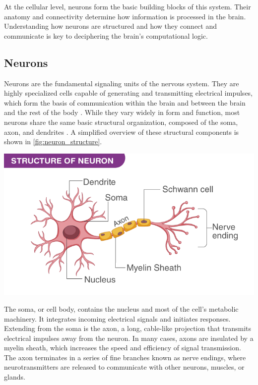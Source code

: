 At the cellular level, neurons form the basic building blocks of this system. Their anatomy and connectivity determine how information is processed in the brain. Understanding how neurons are structured and how they connect and communicate is key to deciphering the brain’s computational logic.

\subsection{Neurons}
Neurons are the fundamental signaling units of the nervous system. They are highly specialized cells capable of generating and transmitting electrical impulses, which form the basis of communication within the brain and between the brain and the rest of the body \cite{Kandel_2013, Purves_2001}. While they vary widely in form and function, most neurons share the same basic structural organization, composed of the soma, axon, and dendrites \cite{Purves_2001}. A simplified overview of these structural components is shown in \autoref{fig:neuron_structure}.

\begin{center}
    \includegraphics[width=.8\textwidth]{figures/01_neuron.png} 
    \label{fig:neuron_structure}
\end{center}

The soma, or cell body, contains the nucleus and most of the cell’s metabolic machinery. It integrates incoming electrical signals and initiates responses. Extending from the soma is the axon, a long, cable-like projection that transmits electrical impulses away from the neuron. In many cases, axons are insulated by a myelin sheath, which increases the speed and efficiency of signal transmission. The axon terminates in a series of fine branches known as nerve endings, where neurotransmitters are released to communicate with other neurons, muscles, or glands.

